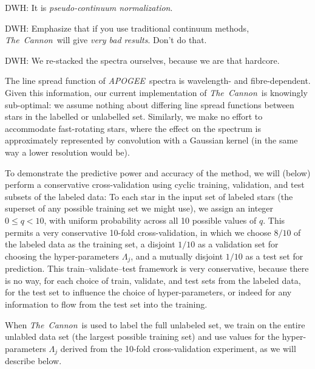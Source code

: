 \documentclass[12pt,preprint]{aastex}
\newcommand{\project}[1]{\textsl{#1}}
\newcommand{\TheCannon}{\project{The~Cannon}}
\newcommand{\tc}{\TheCannon}
\newcommand{\acronym}[1]{{\small{#1}}}
\newcommand{\apogee}{\project{\acronym{APOGEE}}}
\begin{document}
DWH: It is \emph{pseudo-continuum normalization}.

DWH: Emphasize that if you use traditional continuum methods,
\TheCannon\ will give \emph{very bad results}.  Don't do that.

DWH: We re-stacked the spectra ourselves, because we are that hardcore.

The line spread function of \apogee\ spectra is wavelength- and fibre-dependent.
Given this information, our current implementation of \tc\ is knowingly sub-optimal:
we assume nothing about differing line spread functions between stars in the labelled
or unlabelled set. Similarly, we make no effort to accommodate fast-rotating stars, where the effect on the spectrum is approximately represented by convolution with a Gaussian kernel (in the same way a lower resolution would be). 





To demonstrate the predictive power and accuracy of the method, we
will (below) perform a conservative cross-validation using cyclic
training, validation, and test subsets of the labeled data:
To each star in the input set of labeled stars (the superset of any
possible training set we might use), we assign an integer $0\leq
q<10$, with uniform probability across all 10 possible values of $q$.
This permits a very conservative 10-fold cross-validation, in which we
choose $8/10$ of the labeled data as the training set, a disjoint
$1/10$ as a validation set for choosing the hyper-parameters
$\Lambda_j$, and a mutually disjoint $1/10$ as a test set for
prediction.
This train--validate--test framework is very conservative, because there
is no way, for each choice of train, validate, and test sets from the
labeled data, for the test set to influence the choice of
hyper-parameters, or indeed for any information to flow from the test
set into the training.

When \TheCannon\ is used to label the full unlabeled set, we train on
the entire unlabled data set (the largest possible training set) and
use values for the hyper-parameters $\Lambda_j$ derived from the
10-fold cross-validation experiment, as we will describe below.
\end{document}
